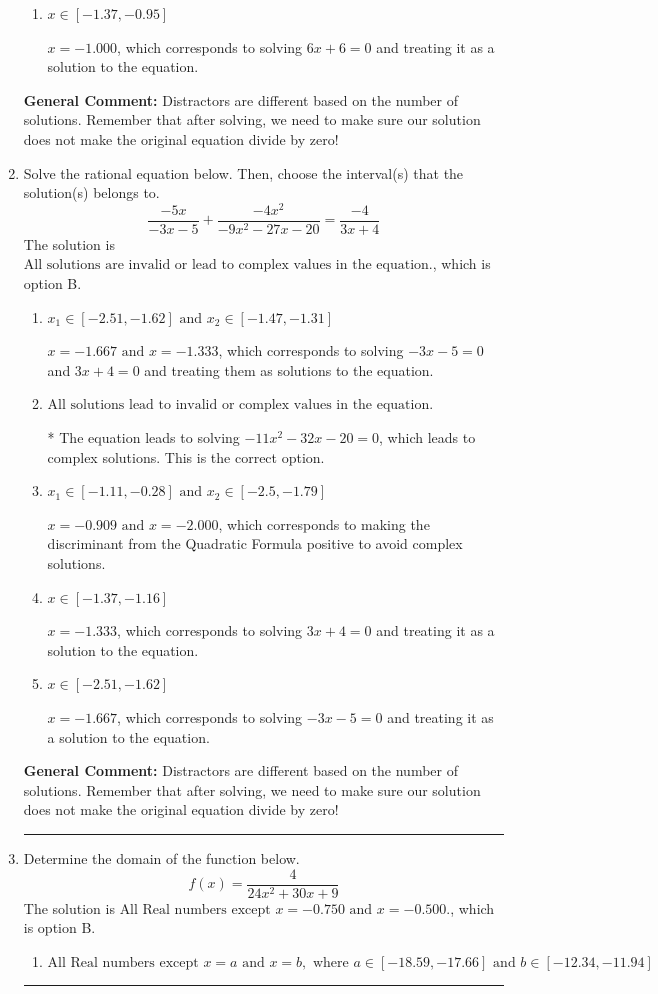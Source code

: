 \documentclass{extbook}[14pt]
\newcommand{\litem}[1]{\item #1

\rule{\textwidth}{0.4pt}}
\begin{document}
\begin{enumerate}
{\begin{enumerate}[label=\Alph*.]
$x = -1.000 \text{ and } x = -1.000$, which corresponds to solving $-5x -5 = 0$ and $6x + 6 = 0$ and treating them as solutions to the equation.
\item \( x \in [-1.37,-0.95] \)

$x = -1.000$, which corresponds to solving $6x + 6 = 0$ and treating it as a solution to the equation.
\end{enumerate}

\textbf{General Comment:} Distractors are different based on the number of solutions. Remember that after solving, we need to make sure our solution does not make the original equation divide by zero!
}
\litem{
Solve the rational equation below. Then, choose the interval(s) that the solution(s) belongs to.
\[ \frac{-5x}{-3x -5} + \frac{-4x^{2}}{-9x^{2} -27 x -20} = \frac{-4}{3x + 4} \]The solution is \( \text{All solutions are invalid or lead to complex values in the equation.} \), which is option B.\begin{enumerate}[label=\Alph*.]
\item \( x_1 \in [-2.51, -1.62] \text{ and } x_2 \in [-1.47,-1.31] \)

$x = -1.667 \text{ and } x = -1.333$, which corresponds to solving $-3x -5 = 0$ and $3x + 4 = 0$ and treating them as solutions to the equation.
\item \( \text{All solutions lead to invalid or complex values in the equation.} \)

* The equation leads to solving $-11x^{2} -32 x -20=0$, which leads to complex solutions. This is the correct option.
\item \( x_1 \in [-1.11, -0.28] \text{ and } x_2 \in [-2.5,-1.79] \)

$x = -0.909 \text{ and } x = -2.000$, which corresponds to making the discriminant from the Quadratic Formula positive to avoid complex solutions.
\item \( x \in [-1.37,-1.16] \)

$x = -1.333$, which corresponds to solving $3x + 4 = 0$ and treating it as a solution to the equation.
\item \( x \in [-2.51,-1.62] \)

$x = -1.667$, which corresponds to solving $-3x -5 = 0$ and treating it as a solution to the equation.
\end{enumerate}

\textbf{General Comment:} Distractors are different based on the number of solutions. Remember that after solving, we need to make sure our solution does not make the original equation divide by zero!
}
\litem{
Determine the domain of the function below.
\[ f(x) = \frac{4}{24x^{2} +30 x + 9} \]The solution is \( \text{All Real numbers except } x = -0.750 \text{ and } x = -0.500. \), which is option B.\begin{enumerate}[label=\Alph*.]
\item \( \text{All Real numbers except } x = a \text{ and } x = b, \text{ where } a \in [-18.59, -17.66] \text{ and } b \in [-12.34, -11.94] \)


\end{enumerate}}
\end{enumerate}
\end{document}
